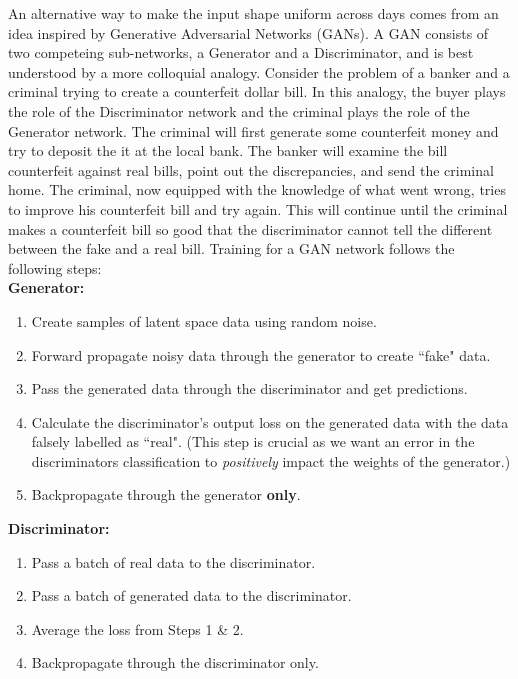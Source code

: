 \documentclass[12pt]{article}
\begin{document}
\indent An alternative way to make the input shape uniform across days comes from an idea inspired by Generative Adversarial Networks (GANs). A GAN consists of two competeing sub-networks, a Generator and a Discriminator, and is best understood by a more colloquial analogy. Consider the problem of a banker and a criminal trying to create a counterfeit dollar bill. In this analogy, the buyer plays the role of the Discriminator network and the criminal plays the role of the Generator network. The criminal will first generate some counterfeit money and try to deposit the it at the local bank. The banker will examine the bill counterfeit against real bills, point out the discrepancies, and send the criminal home. The criminal, now equipped with the knowledge of what went wrong, tries to improve his counterfeit bill and try again. This will continue until the criminal makes a counterfeit bill so good that the discriminator cannot tell the different between the fake and a real bill. Training for a GAN network follows the following steps:  \\
\textbf{Generator:} \\
\begin{enumerate}
  \item Create samples of latent space data using random noise.
  \item Forward propagate noisy data through the generator to create ``fake" data.
  \item Pass the generated data through the discriminator and get predictions.
  \item Calculate the discriminator's output loss on the generated data with the data falsely labelled as ``real". (This step is crucial as we want an error in the discriminators classification to \textit{positively} impact the weights of the generator.)
  \item Backpropagate through the generator \textbf{only}.
  \end{enumerate}
  \textbf{Discriminator:} \\
  \begin{enumerate}
    \item Pass a batch of real data to the discriminator.
    \item Pass a batch of generated data to the discriminator.
    \item Average the loss from Steps 1 \& 2.
    \item Backpropagate through the discriminator only.
  \end{enumerate}
\end{document}
